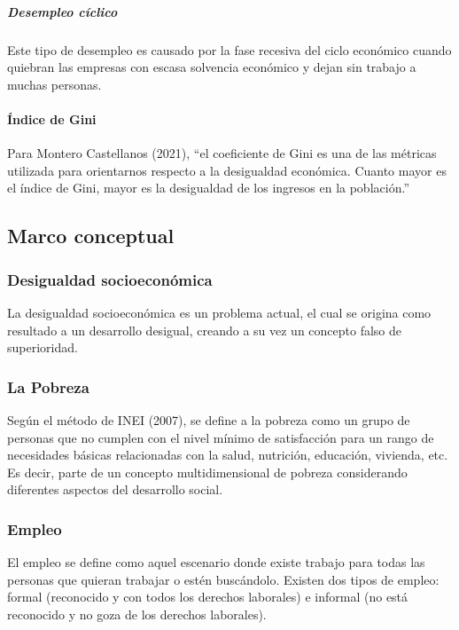   \subparagraph{Desempleo cíclico}
Este tipo de desempleo es causado por la fase recesiva del ciclo económico cuando quiebran las empresas con escasa solvencia económico y dejan sin trabajo a muchas personas.

    \paragraph{Índice de Gini}

Para Montero Castellanos (2021), “el coeficiente de Gini es una de las métricas utilizada para orientarnos respecto a la desigualdad económica. Cuanto mayor es el índice de Gini, mayor es la desigualdad de los ingresos en la población.” 

\subsection{Marco conceptual}

  \subsubsection{Desigualdad socioeconómica}
  
  La desigualdad socioeconómica es un problema actual, el cual se origina como resultado a un desarrollo desigual, creando a su vez un concepto falso de superioridad.
  
  \subsubsection{La Pobreza}
  
  Según el método de INEI (2007), se define a la pobreza como un grupo de personas que no cumplen con el nivel mínimo de satisfacción para un rango de necesidades básicas relacionadas con la salud, nutrición, educación, vivienda, etc. Es decir, parte de un concepto multidimensional de pobreza considerando diferentes aspectos del desarrollo social.
  
  \subsubsection{Empleo}
  
  El empleo se define como aquel escenario donde existe trabajo para todas las personas que quieran trabajar o estén buscándolo. Existen dos tipos de empleo: formal (reconocido y con todos los derechos laborales) e informal (no está reconocido y no goza de los derechos laborales).
  
